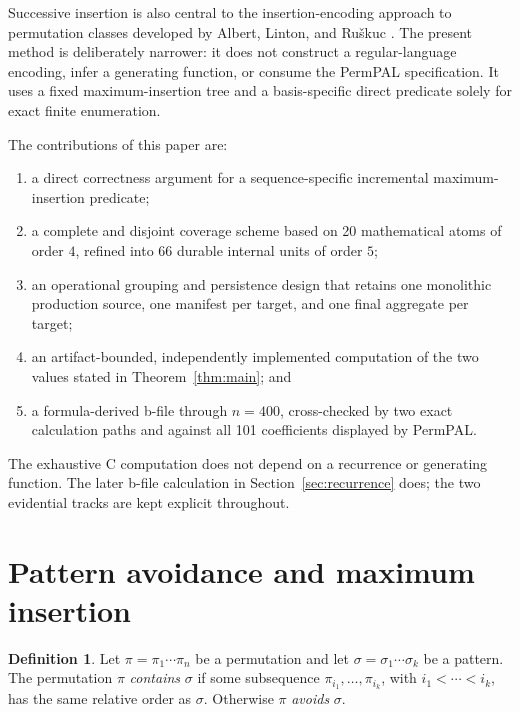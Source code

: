 \documentclass[11pt]{article}
\theoremstyle{definition}
\newtheorem{definition}[theorem]{Definition}
\theoremstyle{remark}
\begin{document}
Successive insertion is also central to the insertion-encoding approach to
permutation classes developed by Albert, Linton, and Ru\v{s}kuc
\cite{albertLintonRuskuc2005}.  The present method is deliberately narrower:
it does not construct a regular-language encoding, infer a generating
function, or consume the PermPAL specification.  It uses a fixed
maximum-insertion tree and a basis-specific direct predicate solely for exact
finite enumeration.

The contributions of this paper are:
\begin{enumerate}
  \item a direct correctness argument for a sequence-specific incremental
        maximum-insertion predicate;
  \item a complete and disjoint coverage scheme based on 20 mathematical
        atoms of order $4$, refined into 66 durable internal units of order
        $5$;
  \item an operational grouping and persistence design that retains one
        monolithic production source, one manifest per target, and one final
        aggregate per target;
  \item an artifact-bounded, independently implemented computation of the two
        values stated in Theorem~\ref{thm:main}; and
  \item a formula-derived b-file through $n=400$, cross-checked by two exact
        calculation paths and against all 101 coefficients displayed by
        PermPAL.
\end{enumerate}

The exhaustive C computation does not depend on a recurrence or generating
function.  The later b-file calculation in Section~\ref{sec:recurrence} does;
the two evidential tracks are kept explicit throughout.

\section{Pattern avoidance and maximum insertion}
\label{sec:mathematics}

\begin{definition}
Let $\pi=\pi_1\cdots\pi_n$ be a permutation and let
$\sigma=\sigma_1\cdots\sigma_k$ be a pattern.  The permutation $\pi$
\emph{contains} $\sigma$ if some subsequence
$\pi_{i_1},\ldots,\pi_{i_k}$, with
$i_1<\cdots<i_k$, has the same relative order as $\sigma$.  Otherwise $\pi$
\emph{avoids} $\sigma$.
\end{definition}
\end{document}
